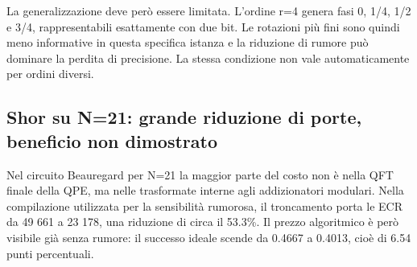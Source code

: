 La generalizzazione deve però essere limitata. L'ordine r=4 genera fasi 0, 1/4, 1/2 e 3/4, rappresentabili esattamente con due bit. Le rotazioni più fini sono quindi meno informative in questa specifica istanza e la riduzione di rumore può dominare la perdita di precisione. La stessa condizione non vale automaticamente per ordini diversi.

\subsection{Shor su N=21: grande riduzione di porte, beneficio non dimostrato}\label{sec:finale_5_5_2}

Nel circuito Beauregard per N=21 la maggior parte del costo non è nella QFT finale della QPE, ma nelle trasformate interne agli addizionatori modulari. Nella compilazione utilizzata per la sensibilità rumorosa, il troncamento porta le ECR da 49 661 a 23 178, una riduzione di circa il 53.3\%. Il prezzo algoritmico è però visibile già senza rumore: il successo ideale scende da 0.4667 a 0.4013, cioè di 6.54 punti percentuali.

